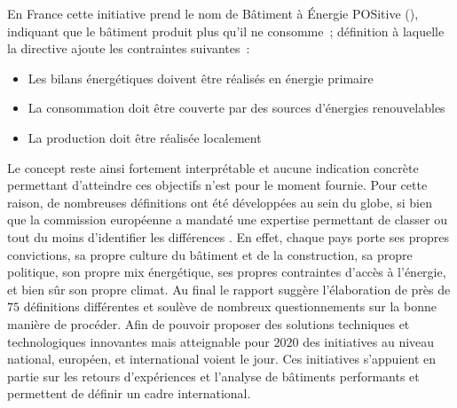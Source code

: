 En France cette initiative prend le nom de Bâtiment à
Énergie POSitive (), indiquant que le bâtiment produit plus qu’il ne consomme~; définition
à laquelle la directive ajoute les contraintes suivantes~:
\begin{itemize}
    \item Les bilans énergétiques doivent être réalisés en énergie primaire
    \item La consommation doit être couverte par des sources d’énergies renouvelables
    \item La production doit être réalisée localement
\end{itemize}
Le concept reste ainsi fortement interprétable et aucune indication concrète
permettant d’atteindre ces objectifs n’est pour le moment fournie.
Pour cette raison, de nombreuses définitions ont été développées au sein du globe,
si bien que la commission européenne a mandaté une expertise permettant de classer ou
tout du moins d’identifier les différences \parencite{ECOFYS2013}. En effet, chaque pays
porte ses propres convictions, sa propre culture du bâtiment et de la construction, sa
propre politique, son propre mix énergétique, ses propres contraintes d’accès à l’énergie,
et bien sûr son propre climat.
Au final le rapport suggère l’élaboration de près de $75$ définitions différentes et
soulève de nombreux questionnements sur la bonne manière de procéder. Afin de pouvoir
proposer des solutions techniques et technologiques innovantes mais atteignable pour
$2020$ des initiatives au niveau national, européen, et international voient le jour.
Ces initiatives s’appuient en partie sur les retours d’expériences et l’analyse de bâtiments
performants et permettent de définir un cadre international.



